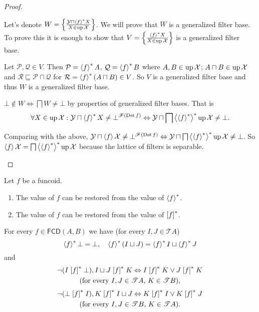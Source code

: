 \begin{proof}
\begin{widedisorder}
Let's denote $W=\left\{ \frac{\mathcal{Y}\sqcap\left\langle f\right\rangle ^{\ast}X}{X\in\operatorname{up}\mathcal{X}}\right\}$.
We will prove that $W$ is a generalized filter base. To prove this
it is enough to show that $V=\left\{ \frac{\left\langle f\right\rangle ^{\ast}X}{X\in\operatorname{up}\mathcal{X}}\right\}$
is a generalized filter base.


Let $\mathcal{P},\mathcal{Q}\in V$. Then $\mathcal{P}=\left\langle f\right\rangle ^{\ast}A$,
$\mathcal{Q}=\left\langle f\right\rangle ^{\ast}B$ where $A,B\in\operatorname{up}\mathcal{X}$; $A\sqcap
B\in\operatorname{up}\mathcal{X}$
and $\mathcal{R}\sqsubseteq\mathcal{P}\sqcap\mathcal{Q}$ for
$\mathcal{R}=\left\langle f\right\rangle ^{\ast}(A\sqcap B)\in V$.
So $V$ is a generalized filter base and thus $W$ is a generalized
filter base.


$\bot\notin W\Leftrightarrow\bigsqcap
W\ne\bot$
by properties of generalized filter bases. That is
\[
\forall X\in\operatorname{up}\mathcal{X}:\mathcal{Y}\sqcap\left\langle f\right\rangle ^{\ast}X\neq\bot^{\mathscr{F}(\operatorname{Dst}
f)}\Leftrightarrow\mathcal{Y}\sqcap\bigsqcap\left\langle \left\langle f\right\rangle ^{\ast}\right\rangle ^{\ast}\operatorname{up}\mathcal{X}\ne\bot.
\]



Comparing with the above, $\mathcal{Y}\sqcap\left\langle f\right\rangle\mathcal{X}\ne\bot^{\mathscr{F}(\operatorname{Dst}
f)}\Leftrightarrow\mathcal{Y}\sqcap\bigsqcap\left\langle \left\langle f\right\rangle ^{\ast}\right\rangle ^{\ast}\operatorname{up}\mathcal{X}\ne\bot$.
So $\left\langle f\right\rangle\mathcal{X}=\bigsqcap\left\langle \left\langle f\right\rangle ^{\ast}\right\rangle ^{\ast}\operatorname{up}\mathcal{X}$
because the lattice of filters is separable.

\end{widedisorder}
\end{proof}
\begin{cor}
Let $f$ be a funcoid.
\begin{enumerate}
\item The value of $f$ can be restored from the value of $\left\langle f\right\rangle ^{\ast}$.
\item The value of $f$ can be restored from the value of $\mathrel{\left[f\right]^{\ast}}$.
\end{enumerate}
\end{cor}
\begin{prop}
For every $f\in\mathsf{FCD}(A,B)$ we have (for every $I,J\in\mathscr{T}A$)
\[
\left\langle f\right\rangle ^{\ast}\bot=\bot,\quad\left\langle f\right\rangle ^{\ast}(I\sqcup
J)=\left\langle f\right\rangle ^{\ast}I\sqcup\left\langle f\right\rangle ^{\ast}J
\]
and
\begin{multline*}
\lnot(I \mathrel{\left[f\right]^{\ast}}\bot), I\sqcup J\mathrel{\left[f\right]^{\ast}}K
\Leftrightarrow I\mathrel{\left[f\right]^{\ast}}K\lor J\mathrel{\left[f\right]^{\ast}}K \\
\text{(for every \ensuremath{I,J\in\mathscr{T}A}, \ensuremath{K\in\mathscr{T}B})},
\end{multline*}
\begin{multline*}
\lnot(\bot \mathrel{\left[f\right]^{\ast}}I), K\mathrel{\left[f\right]^{\ast}}I\sqcup J
\Leftrightarrow K\mathrel{\left[f\right]^{\ast}}I\lor K\mathrel{\left[f\right]^{\ast}}J \\
\text{(for every \ensuremath{I,J\in\mathscr{T}B}, \ensuremath{K\in\mathscr{T}A})}.
\end{multline*}
\end{prop}
